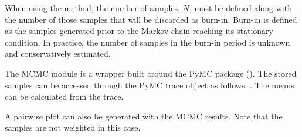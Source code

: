 \documentclass[letterpaper,10pt,english]{sphinxmanual}
\begin{document}
When using the  method, the number of samples, \(N\), must be
defined along with the number of those samples that will be discarded as
burn-in. Burn-in is defined as the samples generated prior to the Markov chain
reaching its stationary condition. In practice, the number of samples in the
burn-in period is unknown and conservatively estimated.

\begin{sphinxVerbatim}[commandchars=\\\{\}]
  
  
 
\end{sphinxVerbatim}

The MCMC module is a wrapper built around the PyMC package (). The stored samples can be accessed through the PyMC trace object as follows: . The means can be calculated from the trace.

\begin{sphinxVerbatim}[commandchars=\\\{\}]
  \PYG{p}{[}\PYG{p}{]}
  \PYG{p}{[}\PYG{p}{]}
\end{sphinxVerbatim}

A pairwise plot can also be generated with the MCMC results. Note that the samples are not weighted in this case.

\begin{sphinxVerbatim}[commandchars=\\\{\}]
\PYG{p}{[} \PYG{p}{]} 
\end{sphinxVerbatim}
\end{document}
